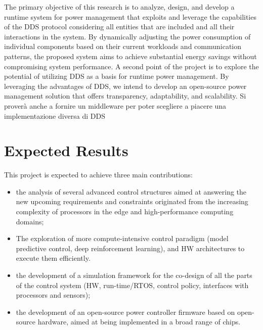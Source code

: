 
The primary objective of this research is to analyze, design, and develop a runtime system for power management that exploits and leverage the capabilities of the DDS protocol considering all entities that are included and all their interactions in the system. 
By dynamically adjusting the power consumption of individual components based on their current workloads and communication patterns, the proposed system aims to achieve substantial energy savings without compromising system performance.
A second point of the project is to explore the potential of utilizing DDS as a basis for runtime power management. By leveraging the advantages of DDS, we intend to develop an open-source power management solution that offers transparency, adaptability, and scalability. %
Si proverà anche a fornire un middleware per poter scegliere a piacere una implementazione diversa di DDS


\section{Expected Results}
This project is expected to achieve three main contributions:
\begin{itemize}
    \item the analysis of several advanced control structures aimed at answering the new upcoming requirements and constraints originated from the increasing complexity of processors in the edge and high-performance computing domains;
    \item The exploration of more compute-intensive control paradigm (model predictive control, deep reinforcement learning), and HW architectures to execute them efficiently.
    \item the development of a simulation framework for the co-design of all the parts of the control system (HW, run-time/RTOS, control policy, interfaces with processors and sensors);
    \item the development of an open-source power controller firmware based on open-source hardware, aimed at being implemented in a broad range of chips.
\end{itemize}



